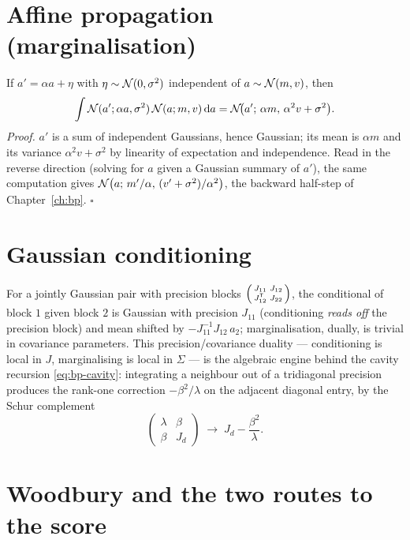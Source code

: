 \section{Affine propagation (marginalisation)}

If $a' = \alpha a + \eta$ with $\eta \sim \mathcal{N}(0, \sigma^2)$ independent of
$a \sim \mathcal{N}(m, v)$, then
\begin{equation}
  \int \mathcal{N}(a'; \alpha a, \sigma^2)\, \mathcal{N}(a; m, v)\, \mathrm{d} a
  = \mathcal{N}\!\big(a';\, \alpha m,\, \alpha^2 v + \sigma^2\big).
  \label{eq:gauss-predict}
\end{equation}
\emph{Proof.} $a'$ is a sum of independent Gaussians, hence Gaussian; its
mean is $\alpha m$ and its variance $\alpha^2 v + \sigma^2$ by linearity
of expectation and independence. Read in the reverse direction (solving
for $a$ given a Gaussian summary of $a'$), the same computation gives
$\mathcal{N}\big(a;\, m'/\alpha,\, (v' + \sigma^2)/\alpha^2\big)$, the backward
half-step of Chapter~\ref{ch:bp}. $\square$

\section{Gaussian conditioning}

For a jointly Gaussian pair with precision blocks
$\begin{psmallmatrix} J_{11} & J_{12} \\ J_{12}^{\mathsf{T}} & J_{22}
\end{psmallmatrix}$, the conditional of block $1$ given block $2$ is
Gaussian with precision $J_{11}$ (conditioning \emph{reads off} the
precision block) and mean shifted by $-J_{11}^{-1} J_{12}\, a_2$;
marginalisation, dually, is trivial in covariance parameters. This
precision/covariance duality --- conditioning is local in $J$,
marginalising is local in $\Sigma$ --- is the algebraic engine behind the
cavity recursion \eqref{eq:bp-cavity}: integrating a neighbour out of a
tridiagonal precision produces the rank-one correction
$-\beta^2/\lambda$ on the adjacent diagonal entry, by the Schur
complement
\begin{equation}
  \begin{pmatrix} \lambda & \beta \\ \beta & J_d \end{pmatrix}
  \;\longrightarrow\;
  J_d - \frac{\beta^2}{\lambda}.
  \label{eq:gauss-schur}
\end{equation}

\section{Woodbury and the two routes to the score}

